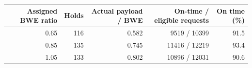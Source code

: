 \begin{tabular}{rrrrr}
\toprule
Assigned BWE ratio & Holds & Actual payload / BWE & On-time / eligible requests & On time (\%) \\
\midrule
0.65 & 116 & 0.582 & 9519 / 10399 & 91.5 \\
0.85 & 135 & 0.745 & 11416 / 12219 & 93.4 \\
1.05 & 133 & 0.802 & 10896 / 12031 & 90.6 \\
\bottomrule
\end{tabular}
